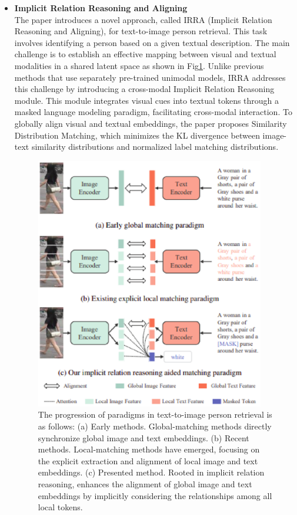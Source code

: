 \begin{itemize}
    \item \textbf{Implicit Relation Reasoning and Aligning}\\
    The paper introduces a novel approach, called IRRA (Implicit Relation Reasoning and Aligning), for text-to-image person retrieval. This task involves identifying a person based on a given textual description. The main challenge is to establish an effective mapping between visual and textual modalities in a shared latent space as shown in Fig\ref{fig:irra}. Unlike previous methods that use separately pre-trained unimodal models, IRRA addresses this challenge by introducing a cross-modal Implicit Relation Reasoning module. This module integrates visual cues into textual tokens through a masked language modeling paradigm, facilitating cross-modal interaction. To globally align visual and textual embeddings, the paper proposes Similarity Distribution Matching, which minimizes the KL divergence between image-text similarity distributions and normalized label matching distributions. 
    \begin{figure}[htbp]
        \begin{center}
            \includegraphics[width=10cm]{img/irra.eps}
            \caption[short]{The progression of paradigms in text-to-image person retrieval is as follows: (a) Early methods. Global-matching methods directly synchronize global image and text embeddings. (b) Recent methods. Local-matching methods have emerged, focusing on the explicit extraction and alignment of local image and text embeddings. (c) Presented method. Rooted in implicit relation reasoning, enhances the alignment of global image and text embeddings by implicitly considering the relationships among all local tokens.}\label{fig:irra}
        \end{center}
    \end{figure}


\end{itemize}
